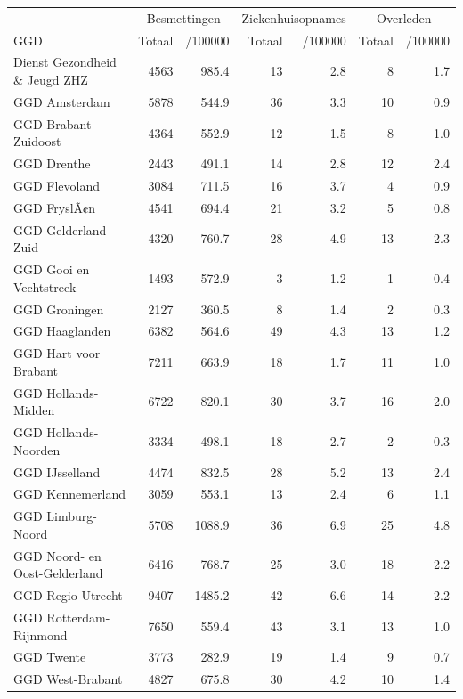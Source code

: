 \documentclass[
  english,
  man,floatsintext]{apa6}
\begin{document}
\begin{table}
\centering\begingroup\fontsize{10}{12}\selectfont

\begin{threeparttable}
\begin{tabular}{lrrrrrr}
\toprule
\multicolumn{1}{c}{ } & \multicolumn{2}{c}{Besmettingen} & \multicolumn{2}{c}{Ziekenhuisopnames} & \multicolumn{2}{c}{Overleden} \\
\cmidrule(l{3pt}r{3pt}){2-3} \cmidrule(l{3pt}r{3pt}){4-5} \cmidrule(l{3pt}r{3pt}){6-7}
GGD & Totaal & /100000 & Totaal & /100000 & Totaal & /100000\\
\midrule
Dienst Gezondheid \& Jeugd ZHZ & 4563 & 985.4 & 13 & 2.8 & 8 & 1.7\\
GGD Amsterdam & 5878 & 544.9 & 36 & 3.3 & 10 & 0.9\\
GGD Brabant-Zuidoost & 4364 & 552.9 & 12 & 1.5 & 8 & 1.0\\
GGD Drenthe & 2443 & 491.1 & 14 & 2.8 & 12 & 2.4\\
GGD Flevoland & 3084 & 711.5 & 16 & 3.7 & 4 & 0.9\\
GGD FryslÃ¢n & 4541 & 694.4 & 21 & 3.2 & 5 & 0.8\\
GGD Gelderland-Zuid & 4320 & 760.7 & 28 & 4.9 & 13 & 2.3\\
GGD Gooi en Vechtstreek & 1493 & 572.9 & 3 & 1.2 & 1 & 0.4\\
GGD Groningen & 2127 & 360.5 & 8 & 1.4 & 2 & 0.3\\
GGD Haaglanden & 6382 & 564.6 & 49 & 4.3 & 13 & 1.2\\
GGD Hart voor Brabant & 7211 & 663.9 & 18 & 1.7 & 11 & 1.0\\
GGD Hollands-Midden & 6722 & 820.1 & 30 & 3.7 & 16 & 2.0\\
GGD Hollands-Noorden & 3334 & 498.1 & 18 & 2.7 & 2 & 0.3\\
GGD IJsselland & 4474 & 832.5 & 28 & 5.2 & 13 & 2.4\\
GGD Kennemerland & 3059 & 553.1 & 13 & 2.4 & 6 & 1.1\\
GGD Limburg-Noord & 5708 & 1088.9 & 36 & 6.9 & 25 & 4.8\\
GGD Noord- en Oost-Gelderland & 6416 & 768.7 & 25 & 3.0 & 18 & 2.2\\
GGD Regio Utrecht & 9407 & 1485.2 & 42 & 6.6 & 14 & 2.2\\
GGD Rotterdam-Rijnmond & 7650 & 559.4 & 43 & 3.1 & 13 & 1.0\\
GGD Twente & 3773 & 282.9 & 19 & 1.4 & 9 & 0.7\\
GGD West-Brabant & 4827 & 675.8 & 30 & 4.2 & 10 & 1.4\\

\end{tabular}
\end{threeparttable}
\end{table}
\end{document}
